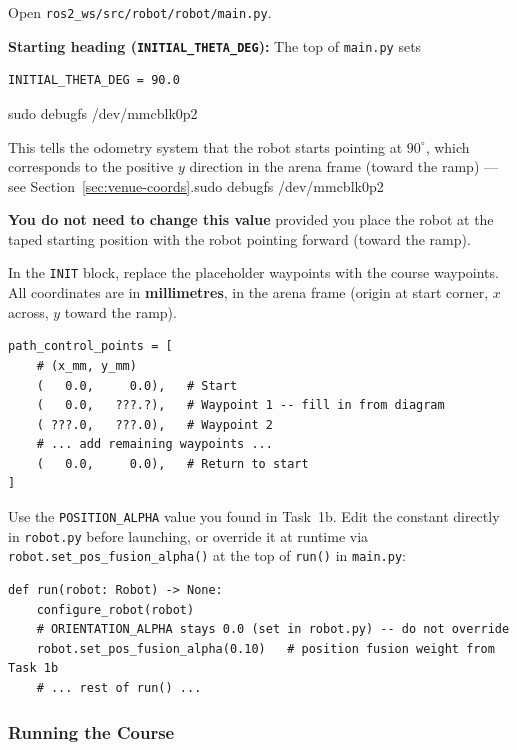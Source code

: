 \documentclass[12pt,letterpaper]{article}
\begin{document}
Open \texttt{ros2\_ws/src/robot/robot/main.py}.

\begin{notebox}
  \textbf{Starting heading (\texttt{INITIAL\_THETA\_DEG}):}
  The top of \texttt{main.py} sets
\begin{lstlisting}[style=python]
INITIAL_THETA_DEG = 90.0
\end{lstlisting}sudo debugfs /dev/mmcblk0p2

  This tells the odometry system that the robot starts pointing at $90^\circ$,
  which corresponds to the positive $y$ direction in the arena frame (toward
  the ramp) --- see Section~\ref{sec:venue-coords}.sudo debugfs /dev/mmcblk0p2

  \textbf{You do not need to change this value} provided you place the robot at
  the taped starting position with the robot pointing forward (toward the ramp).
\end{notebox}

In the \texttt{INIT} block, replace the placeholder waypoints with the course waypoints.
All coordinates are in \textbf{millimetres}, in the arena frame
(origin at start corner, $x$ across, $y$ toward the ramp).

\begin{lstlisting}[style=python, caption={Obstacle course waypoints in main.py (fill in from the course diagram)}]
path_control_points = [
    # (x_mm, y_mm)
    (   0.0,     0.0),   # Start
    (   0.0,   ???.?),   # Waypoint 1 -- fill in from diagram
    ( ???.0,   ???.0),   # Waypoint 2
    # ... add remaining waypoints ...
    (   0.0,     0.0),   # Return to start
]
\end{lstlisting}

\begin{notebox}
  Use the \texttt{POSITION\_ALPHA} value you found in Task~1b.
  Edit the constant directly in \texttt{robot.py} before launching, or
  override it at runtime via \texttt{robot.set\_pos\_fusion\_alpha()} at the
  top of \texttt{run()} in \texttt{main.py}:
\begin{lstlisting}[style=python]
def run(robot: Robot) -> None:
    configure_robot(robot)
    # ORIENTATION_ALPHA stays 0.0 (set in robot.py) -- do not override
    robot.set_pos_fusion_alpha(0.10)   # position fusion weight from Task 1b
    # ... rest of run() ...
\end{lstlisting}
\end{notebox}


\subsubsection{Running the Course}
\end{document}
